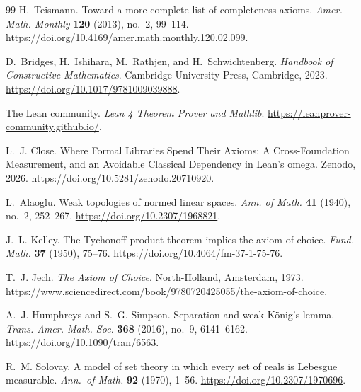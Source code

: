 \documentclass[11pt,reqno]{amsart}
\theoremstyle{redplain}
\begin{document}
\begin{thebibliography}{99}
	 H.~Teismann.
	\newblock Toward a more complete list of completeness axioms.
	\newblock \emph{Amer. Math. Monthly} \textbf{120} (2013), no.~2, 99--114.
	\newblock \url{https://doi.org/10.4169/amer.math.monthly.120.02.099}.
	
	 D.~Bridges, H.~Ishihara, M.~Rathjen, and
	H.~Schwichtenberg.
	\newblock \emph{Handbook of Constructive Mathematics}.
	\newblock Cambridge University Press, Cambridge, 2023.
	\newblock \url{https://doi.org/10.1017/9781009039888}.
	
	 The Lean community.
	\newblock \emph{Lean 4 Theorem Prover and Mathlib}.
	\newblock \url{https://leanprover-community.github.io/}.
	
	 L.~J. Close.
	\newblock Where Formal Libraries Spend Their Axioms: A Cross-Foundation
	Measurement, and an Avoidable Classical Dependency in Lean's omega.
	\newblock Zenodo, 2026.
	\newblock \url{https://doi.org/10.5281/zenodo.20710920}.
	
	 L.~Alaoglu.
	\newblock Weak topologies of normed linear spaces.
	\newblock \emph{Ann. of Math.} \textbf{41} (1940), no.~2, 252--267.
	\newblock \url{https://doi.org/10.2307/1968821}.
	
	 J.~L. Kelley.
	\newblock The Tychonoff product theorem implies the axiom of choice.
	\newblock \emph{Fund. Math.} \textbf{37} (1950), 75--76.
	\newblock \url{https://doi.org/10.4064/fm-37-1-75-76}.
	
	 T.~J. Jech.
	\newblock \emph{The Axiom of Choice}.
	\newblock North-Holland, Amsterdam, 1973.
	\newblock
	\url{https://www.sciencedirect.com/book/9780720425055/the-axiom-of-choice}.
	
	 A.~J. Humphreys and S.~G. Simpson.
	\newblock Separation and weak K\"onig's lemma.
	\newblock \emph{Trans. Amer. Math. Soc.} \textbf{368} (2016), no.~9,
	6141--6162.
	\newblock \url{https://doi.org/10.1090/tran/6563}.
	
	 R.~M. Solovay.
	\newblock A model of set theory in which every set of reals is Lebesgue
	measurable.
	\newblock \emph{Ann.\ of Math.} \textbf{92} (1970), 1--56.
	\newblock \url{https://doi.org/10.2307/1970696}.
	
\end{thebibliography}
\end{document}
